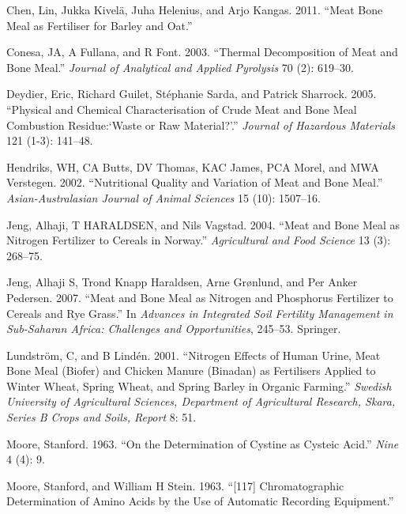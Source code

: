 \documentclass[
]{article}
\newlength{\cslhangindent}
\newenvironment{cslreferences}%
  {\setlength{\parindent}{0pt}%
  \everypar{\setlength{\hangindent}{\cslhangindent}}\ignorespaces}%
  {\par}
\begin{document}
\hypertarget{refs}{}
\begin{cslreferences}
\leavevmode\hypertarget{ref-chen2011meat}{}%
Chen, Lin, Jukka Kivelä, Juha Helenius, and Arjo Kangas. 2011. ``Meat Bone Meal as Fertiliser for Barley and Oat.''

\leavevmode\hypertarget{ref-conesa2003thermal}{}%
Conesa, JA, A Fullana, and R Font. 2003. ``Thermal Decomposition of Meat and Bone Meal.'' \emph{Journal of Analytical and Applied Pyrolysis} 70 (2): 619--30.

\leavevmode\hypertarget{ref-deydier2005physical}{}%
Deydier, Eric, Richard Guilet, Stéphanie Sarda, and Patrick Sharrock. 2005. ``Physical and Chemical Characterisation of Crude Meat and Bone Meal Combustion Residue:`Waste or Raw Material?'.'' \emph{Journal of Hazardous Materials} 121 (1-3): 141--48.

\leavevmode\hypertarget{ref-hendriks2002nutritional}{}%
Hendriks, WH, CA Butts, DV Thomas, KAC James, PCA Morel, and MWA Verstegen. 2002. ``Nutritional Quality and Variation of Meat and Bone Meal.'' \emph{Asian-Australasian Journal of Animal Sciences} 15 (10): 1507--16.

\leavevmode\hypertarget{ref-jeng2004meat}{}%
Jeng, Alhaji, T HARALDSEN, and Nils Vagstad. 2004. ``Meat and Bone Meal as Nitrogen Fertilizer to Cereals in Norway.'' \emph{Agricultural and Food Science} 13 (3): 268--75.

\leavevmode\hypertarget{ref-jeng2007meat}{}%
Jeng, Alhaji S, Trond Knapp Haraldsen, Arne Grønlund, and Per Anker Pedersen. 2007. ``Meat and Bone Meal as Nitrogen and Phosphorus Fertilizer to Cereals and Rye Grass.'' In \emph{Advances in Integrated Soil Fertility Management in Sub-Saharan Africa: Challenges and Opportunities}, 245--53. Springer.

\leavevmode\hypertarget{ref-lundstrom2001nitrogen}{}%
Lundström, C, and B Lindén. 2001. ``Nitrogen Effects of Human Urine, Meat Bone Meal (Biofer) and Chicken Manure (Binadan) as Fertilisers Applied to Winter Wheat, Spring Wheat, and Spring Barley in Organic Farming.'' \emph{Swedish University of Agricultural Sciences, Department of Agricultural Research, Skara, Series B Crops and Soils, Report} 8: 51.

\leavevmode\hypertarget{ref-moore1963determination}{}%
Moore, Stanford. 1963. ``On the Determination of Cystine as Cysteic Acid.'' \emph{Nine} 4 (4): 9.

\leavevmode\hypertarget{ref-moore1963117}{}%
Moore, Stanford, and William H Stein. 1963. ``{[}117{]} Chromatographic Determination of Amino Acids by the Use of Automatic Recording Equipment.''


\end{cslreferences}
\end{document}
